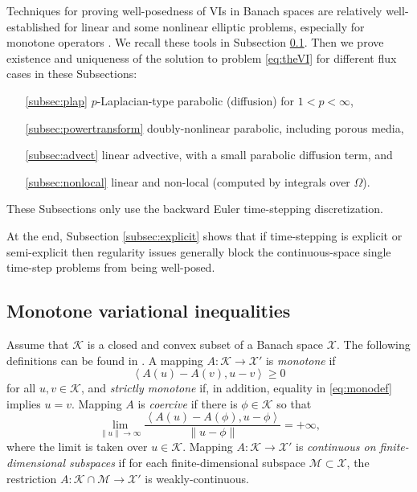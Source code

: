 \documentclass[final,onefignum]{siamart190516}
\newcommand{\ip}[2]{\ensuremath{\left<#1,#2\right>}}
\begin{document}
Techniques for proving well-posedness of VIs in Banach spaces are relatively well-established for linear and some nonlinear elliptic problems, especially for monotone operators \cite{KinderlehrerStampacchia1980}.  We recall these tools in Subsection \ref{subsec:mono}.  Then we prove existence and uniqueness of the solution to problem \eqref{eq:theVI} for different flux cases in these Subsections:
\begin{itemize}
\item[\ref{subsec:plap}] $p$-Laplacian-type parabolic (diffusion) for $1<p<\infty$,
\item[\ref{subsec:powertransform}] doubly-nonlinear parabolic, including porous media,
\item[\ref{subsec:advect}] linear advective, with a small parabolic diffusion term, and
\item[\ref{subsec:nonlocal}] linear and non-local (computed by integrals over $\Omega$).
\end{itemize}
These Subsections only use the backward Euler time-stepping discretization.

At the end, Subsection \ref{subsec:explicit} shows that if time-stepping is explicit or semi-explicit then regularity issues generally block the continuous-space single time-step problems from being well-posed.


\subsection{Monotone variational inequalities} \label{subsec:mono}  Assume that $\mathcal{K}$ is a closed and convex subset of a Banach space $\mathcal{X}$.  The following definitions can be found in \cite{KinderlehrerStampacchia1980}.  A mapping $A : \mathcal{K} \to \mathcal{X}'$ is \emph{monotone} if
\begin{equation}
   \ip{A(u) - A(v)}{u-v} \ge 0  \label{eq:monodef}
\end{equation}
for all $u,v\in\mathcal{K}$, and \emph{strictly monotone} if, in addition, equality in \eqref{eq:monodef} implies $u=v$.  Mapping $A$ is \emph{coercive} if there is $\phi\in \mathcal{K}$ so that
\begin{equation}
   \lim_{\|u\|\to\infty} \frac{\ip{A(u) - A(\phi)}{u-\phi}}{\|u-\phi\|} = +\infty, \label{eq:coercivedef}
\end{equation}
where the limit is taken over $u\in\mathcal{K}$.  Mapping $A : \mathcal{K} \to \mathcal{X}'$ is \emph{continuous on finite-dimensional subspaces} if for each finite-dimensional subspace $\mathcal{M} \subset \mathcal{X}$, the restriction $A : \mathcal{K}\cap \mathcal{M} \to \mathcal{X}'$ is weakly-continuous.
\end{document}
